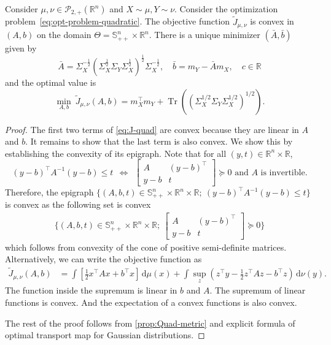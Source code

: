 \documentclass[10pt]{article}
\newcommand{\ud}{\,\mathrm{d}}
\newcommand{\op}[1]{\operatorname{#1}}
\newcommand{\trace}{\op{Tr}}
\renewcommand{\tilde}{\widetilde}
\newcommand{\real}{\mathbb{R}}
\numberwithin{equation}{section}
\begin{document}
\begin{proposition} \label{prop:Quad-landscape}
	Consider $\mu,\nu \in \mathcal{P}_{2,+}(\real^n)$ and $X\sim \mu, Y\sim \nu$. 
	Consider the optimization problem~\eqref{eq:opt-problem-quadratic}. 
	The objective function $\tilde{J}_{\mu,\nu}$ is convex in $(A,b)$ on the domain $\Theta=\mathbb{S}^n_{++} \times \real^n$. There is a unique minimizer $(\bar{A},\bar{b})$ given by
	\begin{equation*}
	\bar{A} = \Sigma_X^{-\frac{1}{2}}\left(\Sigma_X^{\frac{1}{2}}\Sigma_Y\Sigma_X^{\frac{1}{2}}\right)^{\frac{1}{2}}\Sigma_X^{-\frac{1}{2}},\quad \bar{b} = m_Y - \bar{A}m_X,\quad c \in \real
	\end{equation*}	
	and the optimal value is
	\begin{equation*}
	\min_{A,b}~\tilde{J}_{\mu,\nu}(A,b)=m_X^\top m_Y + \trace((\Sigma_X^{1/2}\Sigma_Y\Sigma_X^{1/2})^{1/2}).
	\end{equation*}
\end{proposition}
\begin{proof}
	The first two terms of \eqref{eq:J-quad} are convex because they are linear in $A$ and $b$. It remains to show that the last term is also convex. We show this by establishing the convexity of its epigraph. Note that for all $(y,t)\in\real^n\times \real$,
	\[
	(y-b)^\top A^{-1}(y-b) \leq t ~~\Leftrightarrow~~ \begin{bmatrix} A &(y-b)^\top\\y-b & t\end{bmatrix}\succeq 0 \text{ and $A$ is invertible}.
	\]
	Therefore, the epigraph $\{(A,b,t) \in \mathbb{S}^n_{++} \times \real^n \times \real;~(y-b)^\top A^{-1}(y-b) \leq t\}$ is convex as the following set is convex
	\begin{align*}
	\{(A,b,t) \in \mathbb{S}^n_{++} \times \real^n \times \real;~ \begin{bmatrix} A &(y-b)^\top\\y-b & t\end{bmatrix}\succeq 0\}
	\end{align*}
	which follows from convexity of the cone of positive semi-definite matrices.
	Alternatively, we can write the objective function as
	\begin{equation*}
	\begin{aligned}
	\tilde{J}_{\mu,\nu}(A,b)&= \int \left[\frac{1}{2}x^\top A x + b^\top x \right] \ud\mu(x)+ \int \sup_z\left( z^\top y - \frac{1}{2}z^\top A z - b^\top z \right) \ud\nu(y).
	\end{aligned}
	\end{equation*} 
	The function inside the supremum is linear in $b$ and $A$. The supremum of linear functions is convex. And the expectation of a convex functions is also convex. 
	
	The rest of the proof follows from \autoref{prop:Quad-metric} and explicit formula of optimal transport map for Gaussian distributions.
\end{proof}
\end{document}

